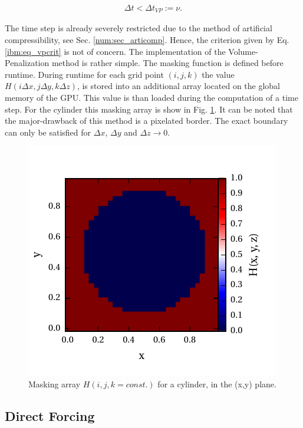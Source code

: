 \begin{align}
    \label{ibm:eq_vpcrit}
    \Delta t < \Delta t_{VP} := \nu.
\end{align}

The time step is already severely restricted due to the method of artificial compressibility, see Sec. \ref{num:sec_articomp}.
Hence, the criterion given by Eq. \ref{ibm:eq_vpcrit} is not of concern.
The implementation of the Volume-Penalization method is rather simple.
The masking function is defined before runtime.
During runtime for each grid point ${(i, j, k)}$ the value ${H(i\Delta x, j\Delta y, k \Delta z)}$,
is stored into an additional array located on the global memory of the GPU.
This value is than loaded during the computation of a time step.
For the cylinder this masking array is show in Fig. \ref{fig:ibm_maskvolpen}.
It can be noted that the major-drawback of this method is a pixelated border.
The exact boundary can only be satisfied for $\Delta x$, $\Delta y$ and $\Delta z \rightarrow 0$.

\begin{figure}[!t]
    \centering
    \includegraphics{gfx/immersed_boundary/methods/mask_volpen.pdf}
    \caption{Masking array $H(i,j,k=const.)$ for a cylinder, in the (x,y) plane.}
    \label{fig:ibm_maskvolpen}
\end{figure}

\subsection{Direct Forcing}
\label{chap:ibm_dirforce}

